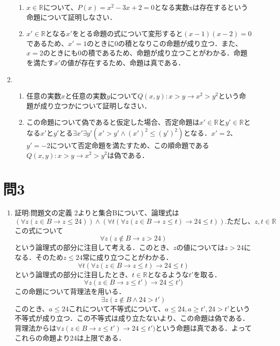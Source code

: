 \documentclass[uplatex]{jsarticle}
\begin{document}
\begin{enumerate}
\begin{enumerate}
			\item $x \in \mathbb{R}$について、$P(x)=x^2 -3x + 2 = 0$となる実数xは存在するという命題について証明しなさい．
			\item $x' \in \mathbb{R}$となる$x'$をとる命題の式について変形すると$(x-1)(x-2)=0$であるため、$x' = 1$のときに0の積となりこの命題が成り立つ．また、$x=2$のときにも0の積であるため、命題が成り立つことがわかる．命題を満たす$x'$の値が存在するため、命題は真である．
		\end{enumerate}
	\item 
		\begin{enumerate}
			\item 任意の実数$x$と任意の実数$y$について$Q( x, y):x > y \rightarrow x^2 > y^2$という命題が成り立つかについて証明しなさい．
			\item この命題について偽であると仮定した場合、否定命題は$x' \in \mathbb{R}$と$y' \in \mathbb{R}$となる$x'$と$y'$とる$\exists x' \exists y' ( x' > y' \wedge (x')^2 \le (y')^2)$となる．$x' = 2$、$y' = -2$について否定命題を満たすため、この順命題である$Q( x, y):x > y \rightarrow x^2 > y^2$は偽である．
		\end{enumerate}
\end{enumerate}

\section{問3}
\begin{enumerate}
	\item 証明:問題文の定義 2よりと集合Bについて、論理式は
		\[
			(\forall z (z \in B \rightarrow z \le 24)) \wedge (\forall t ( \forall z ( z \in B \rightarrow z \le t ) \rightarrow 24 \le t)).\text{ただし、}z, t \in \mathbb{R}
		\]
		この式について
		\[
			\forall z (z \not\in B \rightarrow z > 24)
		\]
		という論理式の部分に注目して考える．このとき、$z$の値については$z > 24$になる．そのため$z \le 24$常に成り立つことがわかる．
		\[
			\forall t ( \forall z ( z \in B \rightarrow z \le t) \rightarrow 24 \le t)
		\]
		という論理式の部分に注目したとき、$t \in \mathbb{R}$となるような$t'$を取る．
		\[
			\forall z ( z \in B \rightarrow z \le t') \rightarrow 24 \le t')
		\]
		この命題について背理法を用いる．
		\[
			\exists z ( z \not\in B \land 24 > t')
		\]
		このとき、$a \le 24$これについて不等式について、$a \le 24, a \ge t' , 24 > t'$という不等式が成り立つ．この不等式は成り立たないより、この命題は偽である．背理法からは$\forall z ( z \in B \rightarrow z \le t') \rightarrow 24 \le t')$という命題は真である．よってこれらの命題より24は上限である．


\end{enumerate}
\end{document}
